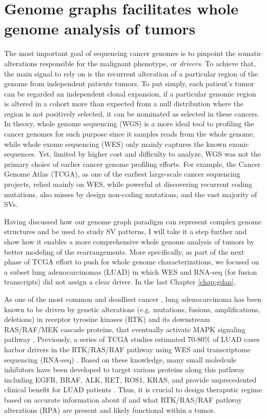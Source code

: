 \documentclass[phd,tocprelim]{cornell}
\begin{document}
\section{Genome graphs facilitates whole genome analysis of tumors}
The most important goal of sequencing cancer genomes is to pinpoint the somatic alterations responsible for the malignant phenotype, or \textit{drivers}. To achieve that, the main signal to rely on is the recurrent alteration of a particular region of the genome from independent patients tumors. To put simply, each patient's tumor can be regarded an independent clonal expansion, if a particular genomic region is altered in a cohort more than expected from a null distribution where the region is not positively selected, it can be nominated as selected in these cancers. In theory, whole genome sequencing (WGS) is a more ideal tool to profiling the cancer genomes for such purpose since it samples reads from the whole genome, while whole exome sequencing (WES) only mainly captures the known exonic sequences. Yet, limited by higher cost and difficulty to analyze, WGS was not the primary choice of earlier cancer genome profiling efforts. For example, the Cancer Genome Atlas (TCGA), as one of the earliest large-scale cancer sequencing projects, relied mainly on WES, while powerful at discovering recurrent coding mutations, also misses by design non-coding mutations, and the vast majority of SVs.

Having discussed how our genome graph paradigm can represent complex genome structures and be used to study SV patterns, I will take it a step further and show how it enables a more comprehensive whole genome analysis of tumors by better modeling of the rearrangements. More specifically, as part of the next phase of TCGA effort to push for whole genome characterizations, we focused on a subset lung adenocarcinomas (LUAD) in which WES and RNA-seq (for fusion transcripts) did not assign a clear driver. In the last Chapter \ref{chap:gdan}, 

As one of the most common and deadliest cancer \cite{Siegel2019-gb}, lung adenocarcinoma has been known to be driven by genetic alterations (e.g. mutations, fusions, amplifications, deletions) in receptor tyrosine kinases (RTK) and its downstream RAS/RAF/MEK cascade proteins, that eventually activate MAPK signaling pathway \cite{Desai2014-qe}. Previously, a series of TCGA studies estimated 70-80\% of LUAD cases harbor drivers in the RTK/RAS/RAF pathway using WES and transcriptome sequencing (RNA-seq) \cite{Campbell2016-xv,Cancer_Genome_Atlas_Research_Network2014-ju,Imielinski2012-vv}. Based on these knowledge, many small moledcule inhibitors have been developed to target various proteins along this pathway including EGFR, BRAF, ALK, RET, ROS1, KRAS, and provide unprecedented clinical benefit for LUAD patients \cite{Zhong2021-st}. Thus, it is crucial to design theraputic regime based on accurate information about if and what RTK/RAS/RAF pathway alterations (RPA) are present and likely functional within a tumor.
\end{document}
